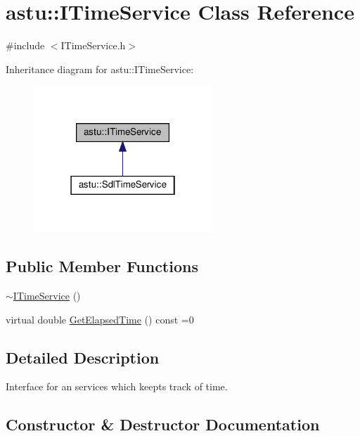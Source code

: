 \hypertarget{classastu_1_1ITimeService}{}\section{astu\+:\+:I\+Time\+Service Class Reference}
\label{classastu_1_1ITimeService}


{\ttfamily \#include $<$I\+Time\+Service.\+h$>$}



Inheritance diagram for astu\+:\+:I\+Time\+Service\+:\nopagebreak
\begin{figure}[H]
\begin{center}
\leavevmode
\includegraphics[width=190pt]{classastu_1_1ITimeService__inherit__graph}
\end{center}
\end{figure}
\subsection*{Public Member Functions}
\begin{DoxyCompactItemize}
\item 
\hyperlink{classastu_1_1ITimeService_a6e05093348b1c9bdc9c34ee74c85524b}{$\sim$\+I\+Time\+Service} ()
\item 
virtual double \hyperlink{classastu_1_1ITimeService_af38c6c5f4fedc705c14b01f2c61b0afc}{Get\+Elapsed\+Time} () const =0
\end{DoxyCompactItemize}


\subsection{Detailed Description}
Interface for an services which keepts track of time. 

\subsection{Constructor \& Destructor Documentation}
\mbox{\label{classastu_1_1ITimeService_a6e05093348b1c9bdc9c34ee74c85524b}} 
